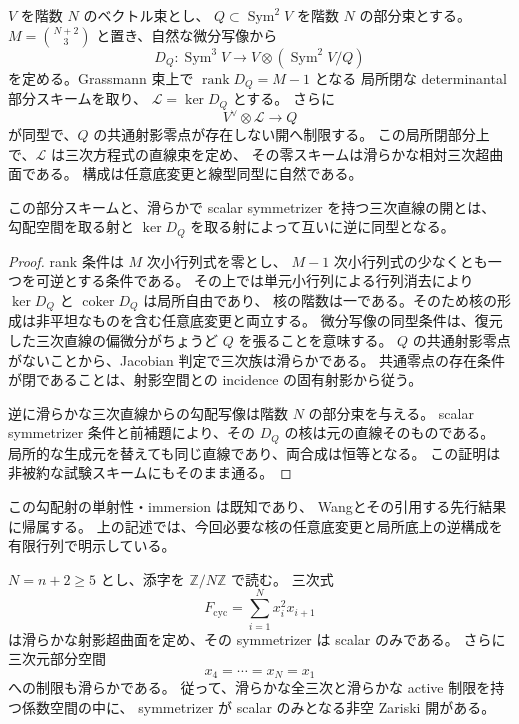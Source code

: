 \begin{proposition}[勾配データからの相対的な方程式直線]
\label{prop:nfm-relative-gradient-line}
$V$ を階数 $N$ のベクトル束とし、
$Q\subset\operatorname{Sym}^2V$ を階数 $N$ の部分束とする。
$M=\binom{N+2}{3}$ と置き、自然な微分写像から
\[
 D_Q:\operatorname{Sym}^3V
 \longrightarrow V\otimes(\operatorname{Sym}^2V/Q)
\]
を定める。Grassmann 束上で $\operatorname{rank}D_Q=M-1$ となる
局所閉な determinantal 部分スキームを取り、
$\mathcal L=\ker D_Q$ とする。
さらに
\[
 V^\vee\otimes\mathcal L\longrightarrow Q
\]
が同型で、$Q$ の共通射影零点が存在しない開へ制限する。
この局所閉部分上で、$\mathcal L$ は三次方程式の直線束を定め、
その零スキームは滑らかな相対三次超曲面である。
構成は任意底変更と線型同型に自然である。

この部分スキームと、滑らかで scalar symmetrizer を持つ三次直線の開とは、
勾配空間を取る射と $\ker D_Q$ を取る射によって互いに逆に同型となる。
\end{proposition}

\begin{proof}
rank 条件は $M$ 次小行列式を零とし、
$M-1$ 次小行列式の少なくとも一つを可逆とする条件である。
その上では単元小行列による行列消去により
$\ker D_Q$ と $\operatorname{coker}D_Q$ は局所自由であり、
核の階数は一である。そのため核の形成は非平坦なものを含む任意底変更と両立する。
微分写像の同型条件は、復元した三次直線の偏微分がちょうど $Q$ を張ることを意味する。
$Q$ の共通射影零点がないことから、Jacobian 判定で三次族は滑らかである。
共通零点の存在条件が閉であることは、射影空間との incidence の固有射影から従う。

逆に滑らかな三次直線からの勾配写像は階数 $N$ の部分束を与える。
scalar symmetrizer 条件と前補題により、その $D_Q$ の核は元の直線そのものである。
局所的な生成元を替えても同じ直線であり、両合成は恒等となる。
この証明は非被約な試験スキームにもそのまま通る。
\end{proof}

この勾配射の単射性・immersion は既知であり、
Wang\cite[Theorem~3.3]{NFMWangMilnor}とその引用する先行結果に帰属する。
上の記述では、今回必要な核の任意底変更と局所底上の逆構成を有限行列で明示している。

\begin{lemma}
\label{lem:nfm-uniform-scalar-symmetrizer}
$N=n+2\ge5$ とし、添字を $\mathbb Z/N\mathbb Z$ で読む。
三次式
\[
 F_{\mathrm{cyc}}=\sum_{i=1}^{N}x_i^2x_{i+1}
\]
は滑らかな射影超曲面を定め、その symmetrizer は scalar のみである。
さらに三次元部分空間
\[
 x_4=\cdots=x_N=x_1
\]
への制限も滑らかである。
従って、滑らかな全三次と滑らかな active 制限を持つ係数空間の中に、
symmetrizer が scalar のみとなる非空 Zariski 開がある。
\end{lemma}

